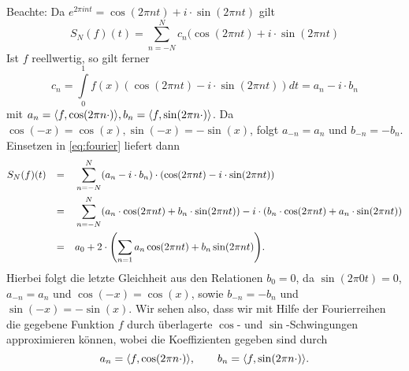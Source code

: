 \begin{anwendung}
	Beachte: Da $e^{2\pi i n t} = \cos(2\pi n t) + i \cdot \sin(2 \pi n t)$ gilt
	\begin{equation}
		S_N(f)(t) = \sum\limits_{n = -N}^{N} c_n (\cos(2 \pi n t) + i \cdot \sin(2 \pi n t) \label{eq:fourier}
	\end{equation}
	Ist $f$ reellwertig, so gilt ferner
	\[
		c_n = \int\limits_{0}^{1} f(x) (\cos(2\pi n t) - i \cdot \sin(2 \pi n t)) dt = a_n - i \cdot b_n
	\]
	mit $a_n = \sk{f, \cos(2 \pi n \cdot)}, b_n = \sk{f,\sin(2\pi n \cdot)}$.
	Da $\cos(-x) = \cos(x), \sin(-x) = - \sin(x)$, folgt $a_{-n} = a_n$ und $b_{-n} = -b_n$.
	Einsetzen in \eqref{eq:fourier} liefert dann
	\begin{align*}
		S_N(f)(t) &\stack{}{=} \sum\limits_{n=-N}^{N} (a_n - i \cdot b_n) \cdot (\cos(2 \pi n t) - i \cdot \sin(2 \pi n t)) \\
		&\stack{}{=} \sum\limits_{n=-N}^{N} (a_n \cdot \cos(2\pi n t) + b_n \cdot \sin(2 \pi n t)) - i \cdot (b_n \cdot \cos(2\pi n t) + a_n \cdot \sin(2 \pi n t)) \\
		&\stack{}{=} a_0 + 2 \cdot \enb{\sum\limits_{n=1}^{} a_n \cos(2 \pi n t) + b_n \sin(2 \pi n t)}.
	\end{align*}
	Hierbei folgt die letzte Gleichheit aus den Relationen $b_0 = 0$, da $\sin(2 \pi 0 t) = 0$, $a_{-n} = a_n$ und $\cos(-x) = \cos(x)$, sowie $b_{-n} = -b_n$ und $\sin(-x) = -\sin(x)$. Wir sehen also, dass wir mit Hilfe der Fourierreihen die gegebene Funktion $f$ durch überlagerte $\cos$- und $\sin$-Schwingungen approximieren können, wobei die Koeffizienten gegeben sind durch
	\[
		a_n = \sk{f,\cos(2\pi n \cdot)}, \qquad b_n = \sk{f,\sin(2\pi n \cdot)}.
	\]
\end{anwendung}
\cleardoubleoddemptypage